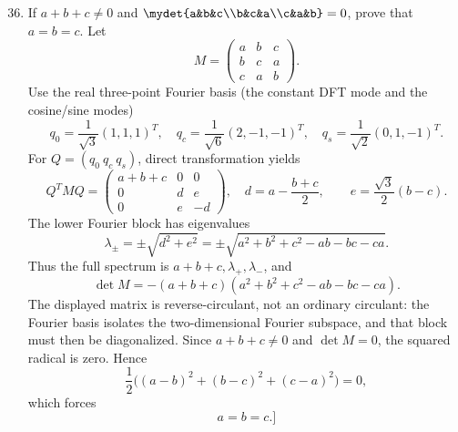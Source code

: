 \begin{enumerate}[label=\theenumi,leftmargin=4mm,itemsep=9pt]
\setcounter{enumi}{35}\item If $a+b+c\ne0$ and $\mydet{a&b&c\\b&c&a\\c&a&b}=0$, prove that $a=b=c$.
\solution Let
\[
M=\begin{pmatrix}a&b&c\\b&c&a\\c&a&b\end{pmatrix}.
\]
Use the real three-point Fourier basis (the constant DFT mode and
the cosine/sine modes)
\[
q_0=\frac1{\sqrt3}(1,1,1)^T,\quad
q_c=\frac1{\sqrt6}(2,-1,-1)^T,\quad
q_s=\frac1{\sqrt2}(0,1,-1)^T.
\]
For \(Q=(q_0\ q_c\ q_s)\), direct transformation yields
\[
Q^TMQ=
\begin{pmatrix}
a+b+c&0&0\\
0&d&e\\
0&e&-d
\end{pmatrix},
\quad
d=a-\frac{b+c}{2},\qquad e=\frac{\sqrt3}{2}(b-c).
\]
The lower Fourier block has eigenvalues
\[
\lambda_\pm=\pm\sqrt{d^2+e^2}
=\pm\sqrt{a^2+b^2+c^2-ab-bc-ca}.
\]
Thus the full spectrum is \(a+b+c,\lambda_+,\lambda_-\), and
\[
\det M=-(a+b+c)(a^2+b^2+c^2-ab-bc-ca).
\]
The displayed matrix is reverse-circulant, not an ordinary
circulant: the Fourier basis isolates the two-dimensional Fourier
subspace, and that block must then be diagonalized. Since
\(a+b+c\ne0\) and \(\det M=0\), the squared radical is zero. Hence
\[
\frac12\bigl((a-b)^2+(b-c)^2+(c-a)^2\bigr)=0,
\]
which forces
\[
\boxed{a=b=c}.
]

\]
\end{enumerate}
